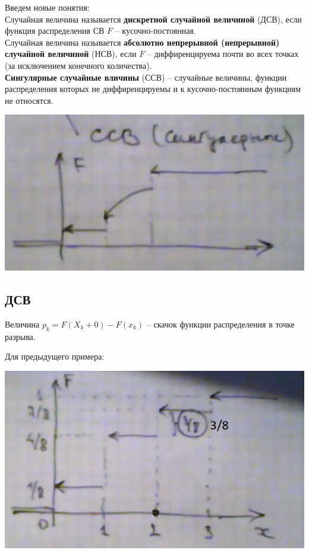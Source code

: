 \documentclass{article}
\begin{document}
Введем новые понятия:
\\

Случайная величина называется \textbf{дискретной случайной величиной} (ДСВ), если функция распределения СВ $F$ -- кусочно-постоянная.
\\

Случайная величина называется \textbf{абсолютно непрерывной (непрерывной) случайной величиной} (НСВ), если $F$ -- диффиренцируема почти во всех точках (за исключением конечного количества). 
\\

\textbf{Сингулярные случайные вличины} (ССВ) -- случайные величины, функции распределения которых не диффиренцируемы и к кусочно-постоянным функциям не относятся.

\begin{center}
    \includegraphics[scale=0.6]{6.png}
\end{center}


\subsection{ДСВ}

Величина $p_k = F(X_k + 0) - F(x_k)$ -- скачок функции распределения в точке разрыва.

Для предыдущего примера:

\begin{center}
    \includegraphics[scale=0.6]{7.png}
\end{center}
\end{document}
